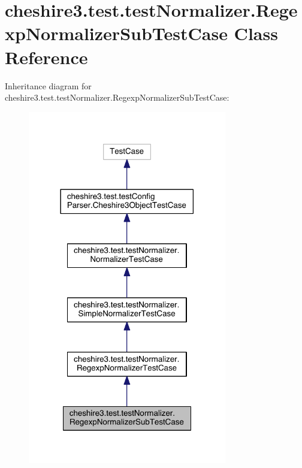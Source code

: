 \hypertarget{classcheshire3_1_1test_1_1test_normalizer_1_1_regexp_normalizer_sub_test_case}{\section{cheshire3.\-test.\-test\-Normalizer.\-Regexp\-Normalizer\-Sub\-Test\-Case Class Reference}
\label{classcheshire3_1_1test_1_1test_normalizer_1_1_regexp_normalizer_sub_test_case}
}


Inheritance diagram for cheshire3.\-test.\-test\-Normalizer.\-Regexp\-Normalizer\-Sub\-Test\-Case\-:
\nopagebreak
\begin{figure}[H]
\begin{center}
\leavevmode
\includegraphics[width=246pt]{classcheshire3_1_1test_1_1test_normalizer_1_1_regexp_normalizer_sub_test_case__inherit__graph}
\end{center}
\end{figure}


